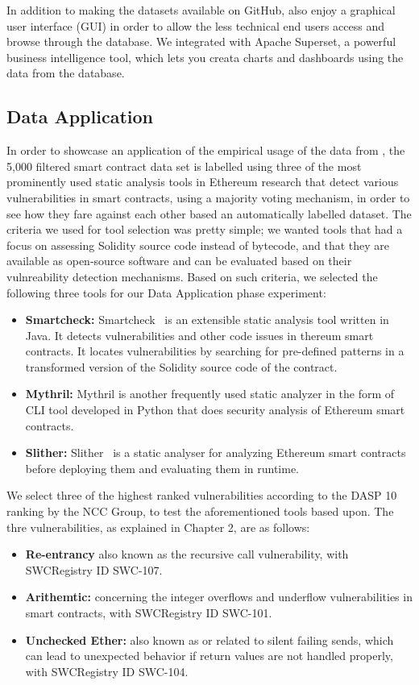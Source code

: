 	In addition to making the datasets available on GitHub, \etherbase also enjoy a graphical user interface (GUI) in order to allow the less technical end users access
	and browse through the database.
	We integrated \etherbase with Apache Superset, a powerful business intelligence tool, which lets you creata charts and dashboards using the data from the database.

\subsection{Data Application}
	In order to showcase an application of the empirical usage of the data from \etherbase, 
	the 5,000 filtered smart contract data set is labelled using three of the most prominently used static analysis tools in Ethereum research that detect
	various vulnerabilities in smart contracts, using a majority voting mechanism, in order to see how they fare against each other based an automatically labelled dataset.
	The criteria we used for tool selection was pretty simple; we wanted tools that had a focus on assessing Solidity source code instead of bytecode,
	and that they are available as open-source software and can be evaluated based on their vulnreability detection mechanisms.
	Based on such criteria, we selected the following three tools for our Data Application phase experiment:
	\begin{itemize}
		\item \textbf{Smartcheck:} Smartcheck~\cite{smartcheck} is an extensible static analysis tool written in Java. It detects vulnerabilities and other code issues in thereum smart contracts. It locates vulnerabilities by searching for pre-defined patterns in a transformed version of the Solidity source code of the contract.
		\item \textbf{Mythril:} Mythril is another frequently used static analyzer in the form of CLI tool developed in Python that does security analysis of Ethereum smart contracts.
		\item \textbf{Slither:} Slither~\cite{slither} is a static analyser for analyzing Ethereum smart contracts before deploying them and evaluating them in runtime.
	\end{itemize}
	
	
	We select three of the highest ranked vulnerabilities according to the DASP 10 ranking by the NCC Group, to test the aforementioned tools based upon.
	The thre vulnerabilities, as explained in Chapter 2, are as follows:
	\begin{itemize}
		\item \textbf{Re-entrancy} also known as the recursive call vulnerability, with SWCRegistry ID SWC-107.
		\item \textbf{Arithemtic:} concerning the integer overflows and underflow vulnerabilities in smart contracts, with SWCRegistry ID SWC-101.
		\item \textbf{Unchecked Ether:} also known as or related to silent failing sends, which can lead to unexpected behavior if return values are not handled properly, with SWCRegistry ID SWC-104.
	\end{itemize} 
	
